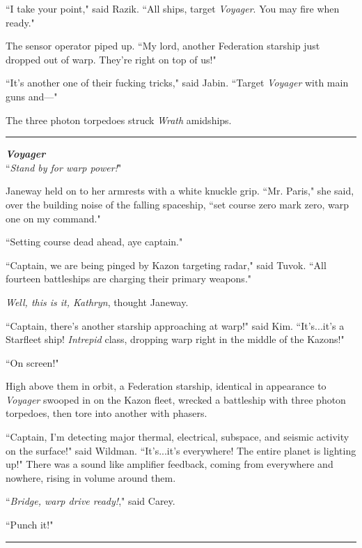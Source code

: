 \documentclass[twoside,letterpaper,12pt]{memoir}
\begin{document}
``I take your point," said Razik. ``All ships, target \textit{Voyager}. You may fire when ready."

The sensor operator piped up. ``My lord, another Federation starship just dropped out of warp. They're right on top of us!"

``It's another one of their fucking tricks," said Jabin. ``Target \textit{Voyager} with main guns and---"

The three photon torpedoes struck \textit{Wrath} amidships.

\begin{center}\rule{3cm}{0.4 pt}\end{center}

\noindent\textit{\textbf{Voyager}}\\

``\textit{Stand by for warp power!}"

Janeway held on to her armrests with a white knuckle grip. ``Mr. Paris," she said, over the building noise of the falling spaceship, ``set course zero mark zero, warp one on my command."

``Setting course dead ahead, aye captain."

``Captain, we are being pinged by Kazon targeting radar," said Tuvok. ``All fourteen battleships are charging their primary weapons."

\textit{Well, this is it, Kathryn}, thought Janeway.

``Captain, there's another starship approaching at warp!" said Kim. ``It's...it's a Starfleet ship! \textit{Intrepid} class, dropping warp right in the middle of the Kazons!"

``On screen!"

High above them in orbit, a Federation starship, identical in appearance to \textit{Voyager} swooped in on the Kazon fleet, wrecked a battleship with three photon torpedoes, then tore into another with phasers.

``Captain, I'm detecting major thermal, electrical, subspace, and seismic activity on the surface!" said Wildman. ``It's...it's everywhere! The entire planet is lighting up!" There was a sound like amplifier feedback, coming from everywhere and nowhere, rising in volume around them.

``\textit{Bridge, warp drive ready!}," said Carey.

``Punch it!"

\begin{center}\rule{3cm}{0.4 pt}\end{center}
\end{document}
